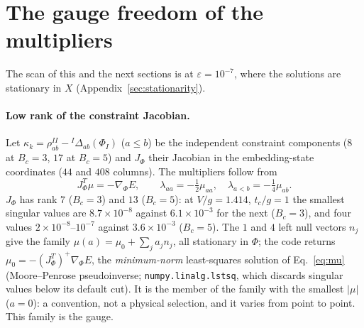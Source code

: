 \documentclass[11pt]{article}
\begin{document}
\section{The gauge freedom of the multipliers}
\label{sec:gauge}

The scan of this and the next sections is at $\varepsilon=10^{-7}$, where the solutions are stationary in $X$ (Appendix~\ref{sec:stationarity}).

\paragraph{Low rank of the constraint Jacobian.} Let $\kappa_k=\rho^{II}_{ab}-{}^I\Delta_{ab}(\Phi_I)$ ($a\le b$) be the independent constraint components ($8$ at $B_c=3$, $17$ at $B_c=5$) and $J_\Phi$ their Jacobian in the embedding-state coordinates ($44$ and $408$ columns). The multipliers follow from
\begin{equation}
J_\Phi^{T}\mu=-\nabla_\Phi E,\qquad \lambda_{aa}=-\tfrac12\mu_{aa},\quad \lambda_{a<b}=-\tfrac14\mu_{ab}.
\label{eq:mu}
\end{equation}
$J_\Phi$ has rank $7$ ($B_c=3$) and $13$ ($B_c=5$): at $V/g=1.414$, $t_c/g=1$ the smallest singular values are $8.7\times10^{-8}$ against $6.1\times10^{-3}$ for the next ($B_c=3$), and four values $2\times10^{-8}$--$10^{-7}$ against $3.6\times10^{-3}$ ($B_c=5$).
The $1$ and $4$ left null vectors $n_j$ give the family $\mu(a)=\mu_0+\sum_ja_jn_j$, all stationary in $\Phi$; the code returns $\mu_0=-(J_\Phi^T)^{+}\nabla_\Phi E$, the \emph{minimum-norm} least-squares solution of Eq.~\eqref{eq:mu} (Moore--Penrose pseudoinverse; \texttt{numpy.linalg.lstsq}, which discards singular values below its default cut). It is the member of the family with the smallest $|\mu|$ ($a=0$): a convention, not a physical selection, and it varies from point to point. This family is the gauge.
\end{document}
